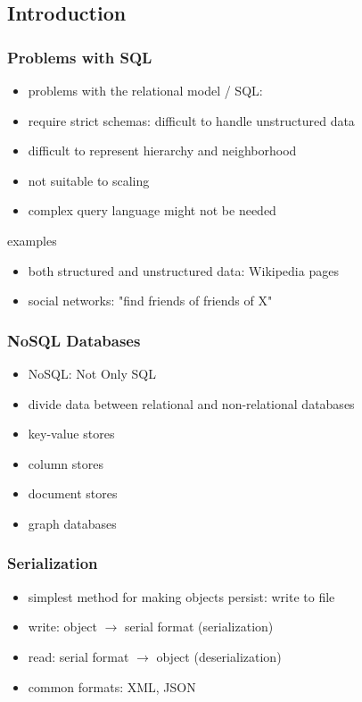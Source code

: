 \documentclass[dvipsnames]{beamer}
\theoremstyle{plain}
\begin{document}
\lstset{language=Java}

\subsection{Introduction}

\begin{frame}
  \frametitle{Problems with SQL}

  \begin{itemize}
    \item problems with the relational model / SQL:

    \smallskip
    \item require strict schemas: difficult to handle unstructured data
    \item difficult to represent hierarchy and neighborhood
    \item not suitable to scaling
    \item complex query language might not be needed
  \end{itemize}

  \pause
  \medskip
  \begin{exampleblock}{examples}
    \begin{itemize}
      \item both structured and unstructured data: Wikipedia pages
      \item social networks: "find friends of friends of X"
    \end{itemize}
  \end{exampleblock}
\end{frame}

\begin{frame}
  \frametitle{NoSQL Databases}

  \begin{itemize}
    \item NoSQL: Not Only SQL
    \item divide data between relational and non-relational databases

    \pause
    \medskip
    \item key-value stores
    \item column stores
    \item document stores
    \item graph databases
  \end{itemize}
\end{frame}

\begin{frame}
  \frametitle{Serialization}

  \begin{itemize}
    \item simplest method for making objects persist: write to file

    \medskip
    \item write: object $\rightarrow$ serial format (\alert{serialization})
    \item read: serial format $\rightarrow$ object (\alert{deserialization})

    \medskip
    \item common formats: XML, JSON
  \end{itemize}
\end{frame}
\end{document}
